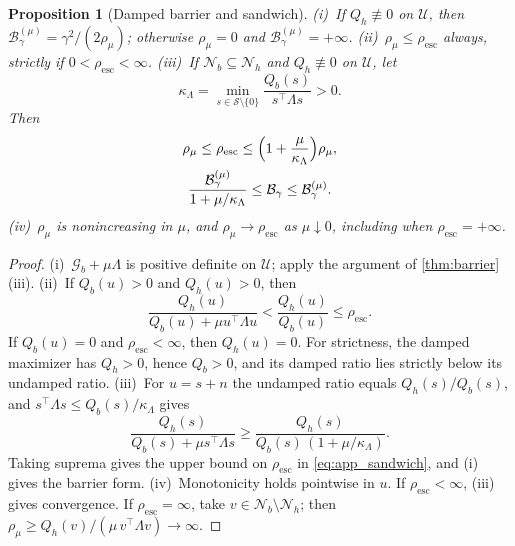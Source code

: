 \documentclass[11pt]{article}
\newtheorem{proposition}{Proposition}
\newcommand{\Gb}{\mathcal{G}_{b}}
\newcommand{\Resc}{\rho_{\mathrm{esc}}}
\newcommand{\Barrier}{\mathcal{B}}
\newcommand{\U}{\mathcal{U}}
\newcommand{\rhoreg}{\rho_{\mu}}
\newcommand{\Nb}{\mathcal{N}_{b}}
\newcommand{\Nh}{\mathcal{N}_{h}}
\begin{document}
\begin{proposition}[Damped barrier and sandwich]
\label{prop:damped}
(i)~If $Q_h\not\equiv0$ on $\U$, then $\Barrier^{(\mu)}_\gamma=\gamma^2/(2\rhoreg)$; otherwise $\rhoreg=0$ and $\Barrier^{(\mu)}_\gamma=+\infty$.
(ii)~$\rhoreg\le\Resc$ always, strictly if $0<\Resc<\infty$.
(iii)~If $\Nb\subseteq\Nh$ and $Q_h\not\equiv0$ on $\U$, let
\begin{equation*}
\kappa_\Lambda=\min_{s\in\mathcal S\setminus\{0\}}\frac{Q_b(s)}{s^\top\Lambda s}>0 .
\end{equation*}
Then
\begin{equation}
\begin{gathered}
\rhoreg\le\Resc\le\Bigl(1+\frac{\mu}{\kappa_\Lambda}\Bigr)\rhoreg,\\
\frac{\Barrier^{(\mu)}_\gamma}{1+\mu/\kappa_\Lambda}\le\Barrier_\gamma\le\Barrier^{(\mu)}_\gamma .
\end{gathered}
\label{eq:app_sandwich}
\end{equation}
(iv)~$\rhoreg$ is nonincreasing in $\mu$, and $\rhoreg\to\Resc$ as $\mu\downarrow0$, including when $\Resc=+\infty$.
\end{proposition}
\begin{proof}
(i)~$\Gb+\mu\Lambda$ is positive definite on $\U$; apply the argument of \cref{thm:barrier}(iii).
(ii)~If $Q_b(u)>0$ and $Q_h(u)>0$, then
\begin{equation*}
\frac{Q_h(u)}{Q_b(u)+\mu u^\top\Lambda u}<\frac{Q_h(u)}{Q_b(u)}\le\Resc .
\end{equation*}
If $Q_b(u)=0$ and $\Resc<\infty$, then $Q_h(u)=0$. For strictness, the damped maximizer has $Q_h>0$, hence $Q_b>0$, and its damped ratio lies strictly below its undamped ratio.
(iii)~For $u=s+n$ the undamped ratio equals $Q_h(s)/Q_b(s)$, and $s^\top\Lambda s\le Q_b(s)/\kappa_\Lambda$ gives
\begin{equation*}
\frac{Q_h(s)}{Q_b(s)+\mu s^\top\Lambda s}\ge\frac{Q_h(s)}{Q_b(s)\,(1+\mu/\kappa_\Lambda)} .
\end{equation*}
Taking suprema gives the upper bound on $\Resc$ in \cref{eq:app_sandwich}, and (i) gives the barrier form.
(iv)~Monotonicity holds pointwise in $u$. If $\Resc<\infty$, (iii) gives convergence. If $\Resc=\infty$, take $v\in\Nb\setminus\Nh$; then $\rhoreg\ge Q_h(v)/(\mu\,v^\top\Lambda v)\to\infty$.
\end{proof}
\end{document}
